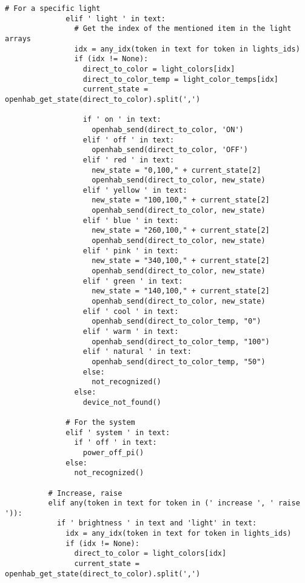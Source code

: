 \begin{lstlisting}[style=PythonCode]
              # For a specific light
              elif ' light ' in text:
                # Get the index of the mentioned item in the light arrays
                idx = any_idx(token in text for token in lights_ids)
                if (idx != None):
                  direct_to_color = light_colors[idx]
                  direct_to_color_temp = light_color_temps[idx]
                  current_state = openhab_get_state(direct_to_color).split(',')

                  if ' on ' in text:
                    openhab_send(direct_to_color, 'ON')
                  elif ' off ' in text:
                    openhab_send(direct_to_color, 'OFF')
                  elif ' red ' in text:
                    new_state = "0,100," + current_state[2]
                    openhab_send(direct_to_color, new_state)
                  elif ' yellow ' in text:
                    new_state = "100,100," + current_state[2]
                    openhab_send(direct_to_color, new_state)
                  elif ' blue ' in text:
                    new_state = "260,100," + current_state[2]
                    openhab_send(direct_to_color, new_state)
                  elif ' pink ' in text:
                    new_state = "340,100," + current_state[2]
                    openhab_send(direct_to_color, new_state)
                  elif ' green ' in text:
                    new_state = "140,100," + current_state[2]
                    openhab_send(direct_to_color, new_state)
                  elif ' cool ' in text:
                    openhab_send(direct_to_color_temp, "0")
                  elif ' warm ' in text:
                    openhab_send(direct_to_color_temp, "100")
                  elif ' natural ' in text:
                    openhab_send(direct_to_color_temp, "50")
                  else:
                    not_recognized()
                else:
                  device_not_found()

              # For the system
              elif ' system ' in text:
                if ' off ' in text:
                  power_off_pi()
              else:
                not_recognized()

          # Increase, raise
          elif any(token in text for token in (' increase ', ' raise ')):
            if ' brightness ' in text and 'light' in text:
              idx = any_idx(token in text for token in lights_ids)
              if (idx != None):
                direct_to_color = light_colors[idx]
                current_state = openhab_get_state(direct_to_color).split(',')


\end{lstlisting}
